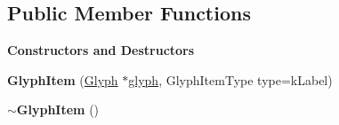 \subsection*{Public Member Functions}
\begin{Indent}\textbf{ Constructors and Destructors}\par
\begin{DoxyCompactItemize}
\item 
\mbox{\label{classrev_1_1_view_1_1_glyph_item_a22d54cd16d93b586eb050675776613fd}} 
{\bfseries Glyph\+Item} (\mbox{\hyperlink{classrev_1_1_glyph}{Glyph}} $\ast$\mbox{\hyperlink{classrev_1_1_view_1_1_glyph_item_a0d40db611729397860483a41a1c8d7b9}{glyph}}, Glyph\+Item\+Type type=k\+Label)
\item 
\mbox{\label{classrev_1_1_view_1_1_glyph_item_a9f119fa36d19be7af0d9ae2ec808dc77}} 
{\bfseries $\sim$\+Glyph\+Item} ()
\end{DoxyCompactItemize}
\end{Indent}
